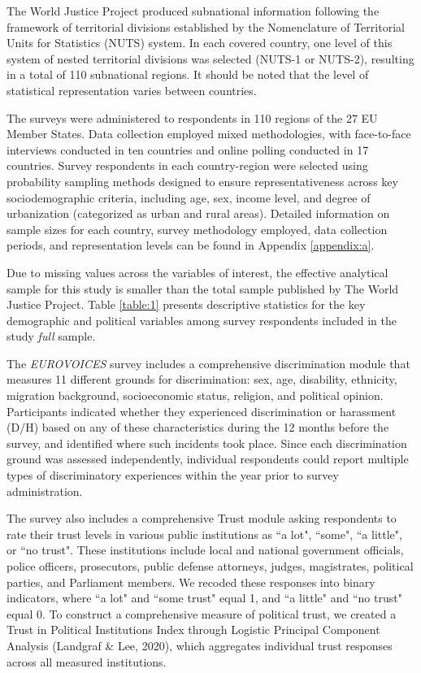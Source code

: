 \documentclass{article}
\begin{document}
The World Justice Project produced subnational information following the framework of territorial divisions established by the Nomenclature of Territorial Units for Statistics (NUTS) system. In each covered country, one level of this system of nested territorial divisions was selected (NUTS-1 or NUTS-2), resulting in a total of 110 subnational regions. It should be noted that the level of statistical representation varies between countries.

The surveys were administered to respondents in 110 regions of the 27 EU Member States. Data collection employed mixed methodologies, with face-to-face interviews conducted in ten countries and online polling conducted in 17 countries. Survey respondents in each country-region were selected using probability sampling methods designed to ensure representativeness across key sociodemographic criteria, including age, sex, income level, and degree of urbanization (categorized as urban and rural areas). Detailed information on sample sizes for each country, survey methodology employed, data collection periods, and representation levels can be found in Appendix \ref{appendix:a}.

Due to missing values across the variables of interest, the effective analytical sample for this study is smaller than the total sample published by The World Justice Project. Table \ref{table:1} presents descriptive statistics for the key demographic and political variables among survey respondents included in the study \emph{full} sample.



The \emph{EUROVOICES} survey includes a comprehensive discrimination module that measures 11 different grounds for discrimination: sex, age, disability, ethnicity, migration background, socioeconomic status, religion, and political opinion. Participants indicated whether they experienced discrimination or harassment (D/H) based on any of these characteristics during the 12 months before the survey, and identified where such incidents took place. Since each discrimination ground was assessed independently, individual respondents could report multiple types of discriminatory experiences within the year prior to survey administration.

The survey also includes a comprehensive Trust module asking respondents to rate their trust levels in various public institutions as ``a lot", ``some", ``a little", or ``no trust". These institutions include local and national government officials, police officers, prosecutors, public defense attorneys, judges, magistrates, political parties, and Parliament members. We recoded these responses into binary indicators, where ``a lot" and ``some trust" equal 1, and ``a little" and ``no trust" equal 0. To construct a comprehensive measure of political trust, we created a Trust in Political Institutions Index through Logistic Principal Component Analysis (Landgraf \& Lee, 2020), which aggregates individual trust responses across all measured institutions.
\end{document}
